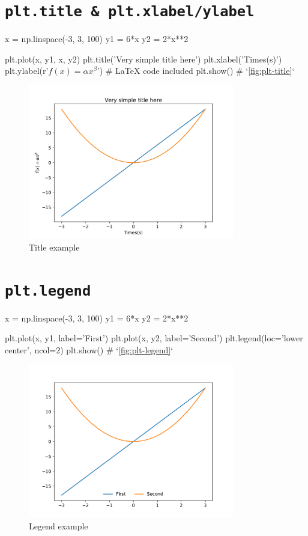 \documentclass{report}
\begin{document}
\section{\texttt{plt.title \& plt.xlabel/ylabel}}
\begin{py}
x = np.linspace(-3, 3, 100)
y1 = 6*x
y2 = 2*x**2

plt.plot(x, y1, x, y2)
plt.title('Very simple title here')
plt.xlabel('Times(s)')
plt.ylabel(r'$f(x)=\alpha x^{\beta}$') # LaTeX code included
plt.show() # `\autoref{fig:plt-title}`
\end{py}

\begin{figure}[!htb]
  \centering
  \includegraphics[width=90mm]{plt-title}
  \caption{Title example}
  \label{fig:plt-title}
\end{figure}

\section{\texttt{plt.legend}}
\begin{py}
x = np.linspace(-3, 3, 100)
y1 = 6*x
y2 = 2*x**2

plt.plot(x, y1, label='First')
plt.plot(x, y2, label='Second')
plt.legend(loc='lower center', ncol=2)
plt.show() # `\autoref{fig:plt-legend}`
\end{py}

\begin{figure}[!htb]
  \centering
  \includegraphics[width=90mm]{plt-legend}
  \caption{Legend example}
  \label{fig:plt-legend}
\end{figure}
\end{document}
